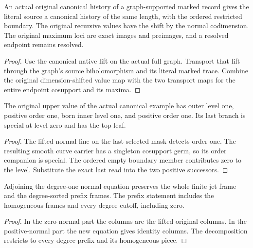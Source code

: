 \begin{theorem}
\label{hir:g1-finite-native-graph-canonical-history}
\leanok
An actual original canonical history of a graph-supported
marked record gives the literal source a canonical history
of the same length, with the ordered restricted boundary.
The original recursive values have the shift by the normal
codimension. The original maximum loci are exact images and
preimages, and a resolved endpoint remains resolved.
\end{theorem}
\begin{proof}
Use the canonical native lift on the actual full graph.
Transport that lift through the graph's source
biholomorphism and its literal marked trace. Combine the
original dimension-shifted value map with the two transport
maps for the entire endpoint cosupport and its maxima.
\end{proof}

\begin{theorem}
\label{hir:g1-joint-example-exact-born-leaf}
\leanok
The original upper value of the actual canonical example has
outer level one, positive order one, born inner level one,
and positive order one. Its last branch is special at level
zero and has the top leaf.
\end{theorem}
\begin{proof}
The lifted normal line on the last selected mask detects
order one. The resulting smooth curve carrier has a singleton
cosupport germ, so its order companion is special. The ordered
empty boundary member contributes zero to the level. Substitute
the exact last read into the two positive successors.
\end{proof}

\begin{theorem}
\label{hir:g1-closed-normal-jet-frames}
\leanok
Adjoining the degree-one normal equation preserves the whole
finite jet frame and the degree-sorted prefix frames. The
prefix statement includes the homogeneous frames and every
degree cutoff, including zero.
\end{theorem}
\begin{proof}
In the zero-normal part the columns are the lifted original
columns. In the positive-normal part the new equation gives
identity columns. The decomposition restricts to every
degree prefix and its homogeneous piece.
\end{proof}

